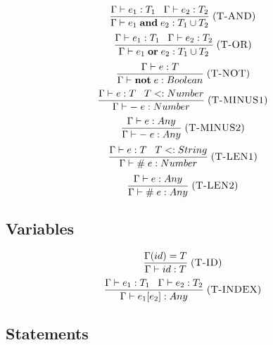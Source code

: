 \documentclass[12pt]{article}
\newcommand{\mylabel}[1]{\; (\textsc{#1})}
\newcommand{\subtype}{<:}
\newcommand{\env}{\Gamma}
\begin{document}
\[
\frac{\env \vdash e_{1}:T_{1} \;\;\; \env \vdash e_{2}:T_{2}}
     {\env \vdash e_{1} \; \mathbf{and} \; e_{2} : T_{1} \cup T_{2}}
\mylabel{T-AND}
\]
\[
\frac{\env \vdash e_{1}:T_{1} \;\;\; \env \vdash e_{2}:T_{2}}
     {\env \vdash e_{1} \; \mathbf{or} \; e_{2} : T_{1} \cup T_{2}}
\mylabel{T-OR}
\]
\[
\frac{\env \vdash e:T}
     {\env \vdash \mathbf{not} \; e : Boolean}
\mylabel{T-NOT}
\]
\[
\frac{\env \vdash e:T \;\;\; T \subtype Number}
     {\env \vdash - \; e : Number}
\mylabel{T-MINUS1}
\]
\[
\frac{\env \vdash e:Any}
     {\env \vdash - \; e : Any}
\mylabel{T-MINUS2}
\]
\[
\frac{\env \vdash e:T \;\;\; T \subtype String}
     {\env \vdash \# \; e : Number}
\mylabel{T-LEN1}
\]
\[
\frac{\env \vdash e:Any}
     {\env \vdash \# \; e : Any}
\mylabel{T-LEN2}
\]

\subsection{Variables}

\[
\frac{\env(id) = T}
     {\env \vdash id : T}
\mylabel{T-ID}
\]
\[
\frac{\env \vdash e_{1}:T_{1} \;\;\; \env \vdash e_{2}:T_{2}}
     {\env \vdash e_{1}[e_{2}] : Any}
\mylabel{T-INDEX}
\]

\subsection{Statements}
\end{document}
